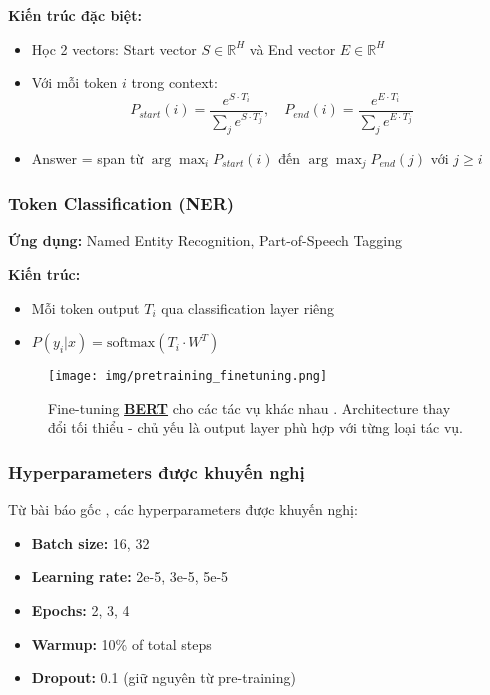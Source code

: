 \textbf{Kiến trúc đặc biệt:}
\begin{itemize}
    \item Học 2 vectors: Start vector $S \in \mathbb{R}^H$ và End vector $E \in \mathbb{R}^H$
    \item Với mỗi token $i$ trong context:
    \begin{equation}
    P_{start}(i) = \frac{e^{S \cdot T_i}}{\sum_j e^{S \cdot T_j}}, \quad P_{end}(i) = \frac{e^{E \cdot T_i}}{\sum_j e^{E \cdot T_j}}
    \label{eq:qa_probability}
    \end{equation}
    \item Answer = span từ $\arg\max_i P_{start}(i)$ đến $\arg\max_j P_{end}(j)$ với $j \geq i$
\end{itemize}

\subsubsection{Token Classification (NER)}
\textbf{Ứng dụng:} Named Entity Recognition, Part-of-Speech Tagging

\textbf{Kiến trúc:}
\begin{itemize}
    \item Mỗi token output $T_i$ qua classification layer riêng
    \item $P(y_i|x) = \text{softmax}(T_i \cdot W^T)$
\end{itemize}

\begin{figure}[H]
    \centering
    \texttt{[image: img/pretraining\_finetuning.png]}
    \caption{Fine-tuning \hyperref[acro:bert]{\textbf{BERT}} cho các tác vụ khác nhau \cite{devlin2018bert}. Architecture thay đổi tối thiểu - chủ yếu là output layer phù hợp với từng loại tác vụ.}
    \label{fig:bert_finetuning_tasks}
\end{figure}

\subsubsection{Hyperparameters được khuyến nghị}
Từ bài báo gốc \cite{devlin2018bert}, các hyperparameters được khuyến nghị:
\begin{itemize}
    \item \textbf{Batch size:} 16, 32
    \item \textbf{Learning rate:} 2e-5, 3e-5, 5e-5 
    \item \textbf{Epochs:} 2, 3, 4
    \item \textbf{Warmup:} 10\% of total steps
    \item \textbf{Dropout:} 0.1 (giữ nguyên từ pre-training)
\end{itemize}

